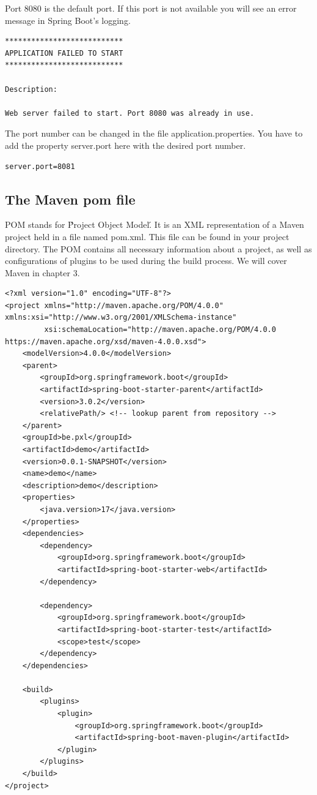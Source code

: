 \documentclass[a4paper, 12pt]{report}
\begin{document}
Port 8080 is the default port. If this port is not available you will see an error message in Spring Boot's logging.

\begin{lstlisting}[frame=single]
***************************
APPLICATION FAILED TO START
***************************

Description:

Web server failed to start. Port 8080 was already in use.
\end{lstlisting}

The port number can be changed in the file application.properties. You have to add the property server.port here with the desired port number.

\begin{lstlisting}[frame=single]
server.port=8081
\end{lstlisting}

\subsection{The Maven pom file}

POM stands for \'Project Object Model\'. It is an XML representation of a Maven project held in a file named pom.xml. This file can be found in your project directory. The POM contains all necessary information about a project, as well as configurations of plugins to be used during the build process. We will cover Maven in chapter 3.

\begin{lstlisting}[frame=single]
<?xml version="1.0" encoding="UTF-8"?>
<project xmlns="http://maven.apache.org/POM/4.0.0" xmlns:xsi="http://www.w3.org/2001/XMLSchema-instance"
         xsi:schemaLocation="http://maven.apache.org/POM/4.0.0 https://maven.apache.org/xsd/maven-4.0.0.xsd">
    <modelVersion>4.0.0</modelVersion>
    <parent>
        <groupId>org.springframework.boot</groupId>
        <artifactId>spring-boot-starter-parent</artifactId>
        <version>3.0.2</version>
        <relativePath/> <!-- lookup parent from repository -->
    </parent>
    <groupId>be.pxl</groupId>
    <artifactId>demo</artifactId>
    <version>0.0.1-SNAPSHOT</version>
    <name>demo</name>
    <description>demo</description>
    <properties>
        <java.version>17</java.version>
    </properties>
    <dependencies>
        <dependency>
            <groupId>org.springframework.boot</groupId>
            <artifactId>spring-boot-starter-web</artifactId>
        </dependency>

        <dependency>
            <groupId>org.springframework.boot</groupId>
            <artifactId>spring-boot-starter-test</artifactId>
            <scope>test</scope>
        </dependency>
    </dependencies>

    <build>
        <plugins>
            <plugin>
                <groupId>org.springframework.boot</groupId>
                <artifactId>spring-boot-maven-plugin</artifactId>
            </plugin>
        </plugins>
    </build>
</project>
\end{lstlisting}
\end{document}
